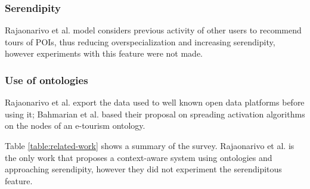 \subsubsection{Serendipity}
Rajaonarivo et al. \cite{rajaonarivo2019rec} model considers previous activity of other users to recommend tours of POIs, thus reducing overspecialization and increasing serendipity, however experiments with this feature were not made.

\subsubsection{Use of ontologies}
Rajaonarivo et al. \cite{rajaonarivo2019rec} export the data used to well known open data platforms before using it; Bahmarian et al. \cite{bahramian_abbaspour_claramunt_2017} based their proposal on spreading activation algorithms on the nodes of an e-tourism ontology.

Table \ref{table:related-work} shows a summary of the survey. Rajaonarivo et al. \cite{rajaonarivo2019rec} is the only work that proposes a context-aware system using ontologies and approaching serendipity, however they did not experiment the serendipitous feature.

